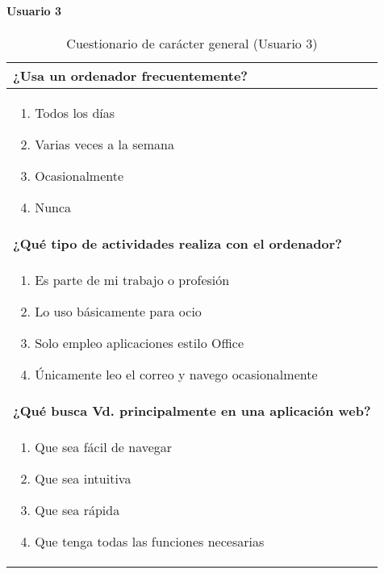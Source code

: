 \paragraph*{Usuario 3}
\begin{table}[H]
\centering
\caption{Cuestionario de carácter general (Usuario 3)}
\begin{tabular}{p{36em}}
\toprule
\rowcolor[rgb]{ .949,  .949,  .949} \textbf{¿Usa un ordenador frecuentemente?} \\ \midrule
\vspace{-4mm}
\begin{enumerate}
\item Todos los días
\item \colorbox{blue!30}{Varias veces a la semana}
\item Ocasionalmente
\item Nunca
\end{enumerate} \\ \midrule
\rowcolor[rgb]{ .949,  .949,  .949} \textbf{¿Qué tipo de actividades realiza con el ordenador?} \\ \midrule
\vspace{-4mm}
\begin{enumerate}
\item Es parte de mi trabajo o profesión
\item Lo uso básicamente para ocio
\item \colorbox{blue!30}{Solo empleo aplicaciones estilo Office}
\item Únicamente leo el correo y navego ocasionalmente
\end{enumerate} \\ \midrule
\rowcolor[rgb]{ .949,  .949,  .949} \textbf{¿Qué busca Vd. principalmente en una aplicación web?} \\ \midrule
\vspace{-4mm}
\begin{enumerate}
\item Que sea fácil de navegar
\item \colorbox{blue!30}{Que sea intuitiva}
\item Que sea rápida
\item Que tenga todas las funciones necesarias
\end{enumerate} \\ \bottomrule
\end{tabular}
\end{table}

